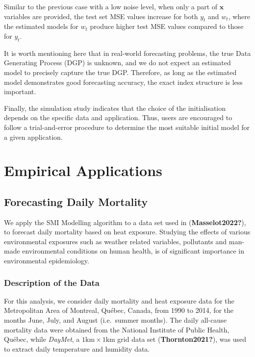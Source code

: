 \documentclass[
  11pt,
  a4paper,
]{report}
\begin{document}
Similar to the previous case with a low noise level, when only a part of
\(\bm{x}\) variables are provided, the test set MSE values increase for
both \(y_{t}\) and \(w_{t}\), where the estimated models for \(w_{t}\)
produce higher test MSE values compared to those for \(y_{t}\).

It is worth mentioning here that in real-world forecasting problems, the
true Data Generating Process (DGP) is unknown, and we do not expect an
estimated model to precisely capture the true DGP. Therefore, as long as
the estimated model demonstrates good forecasting accuracy, the exact
index structure is less important.

Finally, the simulation study indicates that the choice of the
initialisation depends on the specific data and application. Thus, users
are encouraged to follow a trial-and-error procedure to determine the
most suitable initial model for a given application.

\section{Empirical Applications}\label{sec-application}

\subsection{Forecasting Daily Mortality}\label{sec-mortality}

We apply the SMI Modelling algorithm to a data set used in
(\textbf{Masselot2022?}), to forecast daily mortality based on heat
exposure. Studying the effects of various environmental exposures such
as weather related variables, pollutants and man-made environmental
conditions on human health, is of significant importance in
environmental epidemiology.

\subsubsection{Description of the Data}\label{description-of-the-data}

For this analysis, we consider daily mortality and heat exposure data
for the Metropolitan Area of Montreal, Québec, Canada, from 1990 to
2014, for the months June, July, and August (i.e.~summer months). The
daily all-cause mortality data were obtained from the National Institute
of Public Health, Québec, while \emph{DayMet}, a
\(1\text{km} \times 1\text{km}\) grid data set (\textbf{Thornton2021?}),
was used to extract daily temperature and humidity data.
\end{document}
